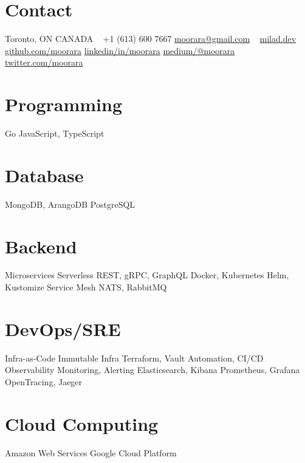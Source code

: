 \documentclass[]{cv-style}                     %
\begin{document}
\lastupdated



\begin{aside}
%
\section{Contact}
Toronto, ON  CANADA
~
+1 (613) 600 7667
\href{mailto:moorara@gmail.com}{moorara@gmail.com}
~
\href{https://milad.dev}{milad.dev}
\href{https://github.com/moorara}{github.com/moorara}
\href{https://linkedin.com/in/moorara}{linkedin/in/moorara}
\href{https://medium.com/@moorara}{medium/@moorara}
\href{http://twitter.com/moorara}{twitter.com/moorara}
%
\section{Programming}
Go
JavaScript, TypeScript
%
\section{Database}
MongoDB, ArangoDB
PostgreSQL
%
\section{Backend}
Microservices
Serverless
REST, gRPC, GraphQL
Docker, Kubernetes
Helm, Kustomize
Service Mesh
NATS, RabbitMQ
%
%
\section{DevOps/SRE}
Infra-as-Code
Immutable Infra
Terraform, Vault
Automation, CI/CD
Observability
Monitoring, Alerting
Elasticsearch, Kibana
Prometheus, Grafana
OpenTracing, Jaeger
%
\section{Cloud Computing}
Amazon Web Services
Google Cloud Platform
%

\end{aside}
\end{document}
